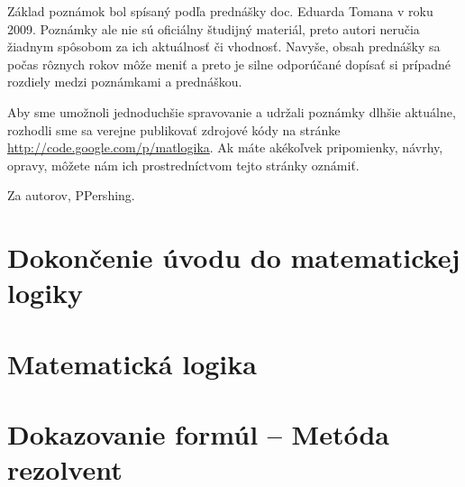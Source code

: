 \documentclass[a4paper]{report}
\begin{document}
Základ poznámok bol spísaný podľa prednášky doc. Eduarda Tomana v roku 2009.
Poznámky ale nie sú oficiálny študijný materiál, preto autori neručia
žiadnym spôsobom za ich aktuálnosť či vhodnosť. Navyše, obsah prednášky sa
počas rôznych rokov môže meniť a preto je silne odporúčané dopísať si
prípadné rozdiely medzi poznámkami a prednáškou.

Aby sme umožnoli jednoduchšie spravovanie a udržali poznámky dlhšie
aktuálne, rozhodli sme sa verejne publikovať zdrojové kódy na stránke
\url{http://code.google.com/p/matlogika}. Ak máte akékoľvek pripomienky,
návrhy, opravy, môžete nám ich prostredníctvom tejto stránky oznámiť.

Za autorov, PPershing.

\tableofcontents

\chapter{Dokončenie úvodu do matematickej logiky}





\chapter{Matematická logika}




\chapter{Dokazovanie formúl -- Metóda rezolvent}




\end{document}

